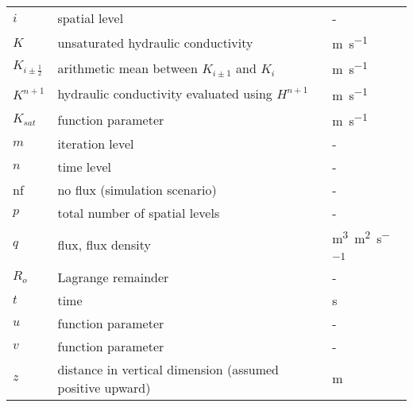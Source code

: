 {\begin{longtabu}{l L l}
    $i$ & spatial level & - \\
    $K$ & unsaturated hydraulic conductivity & \si{\metre\per\second} \\
    $K_{i\pm\frac{1}{2}}$ & arithmetic mean between $K_{i\pm1}$ and $K_i$ & \si{\metre\per\second} \\
    $K^{n+1}$ & hydraulic conductivity evaluated using $H^{n+1}$ & \si{\metre\per\second} \\
    $K_{sat}$ & function parameter & \si{\metre\per\second} \\
    $m$ & iteration level & - \\
    $n$ & time level & - \\
    nf & no flux (simulation scenario) & - \\
    $p$ & total number of spatial levels & - \\
    $q$ & flux, flux density & \si{\cubic\metre\per\square\metre\per\second}\\
    $R_o$ & Lagrange remainder & - \\
    $t$ & time & \si{\second} \\
    $u$ & function parameter & - \\
    $v$ & function parameter & - \\
    $z$ & distance in vertical dimension (assumed positive upward) & \si{\metre} \\
  \end{longtabu}
  
}

